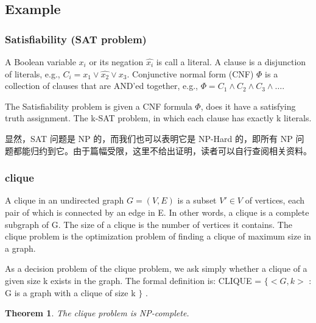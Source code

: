 \documentclass{article}
\newtheorem*{Theorem}{Theorem}
\begin{document}
\subsection{Example}

\subsubsection{Satisfiability (SAT problem)}
A Boolean variable $x_i$ or its negation $\hat{x_i}$ is call a literal. A clause is a disjunction of literals, e.g., $C_i = x_1 \lor \hat{x_2} \lor x_3$. Conjunctive normal form (CNF) $\Phi$ is a collection of clauses that are AND'ed together, e.g., $\Phi = C_1 \land C_2 \land C_3 \land \dots$.\par
The Satisfiability problem is given a CNF formula $\Phi$, does it have a satisfying truth assignment. The k-SAT problem, in which each clause has exactly k literals.

显然，SAT 问题是 NP 的，而我们也可以表明它是 NP-Hard 的，即所有 NP 问题都能归约到它。由于篇幅受限，这里不给出证明，读者可以自行查阅相关资料。

\subsubsection{clique}
A clique in an undirected graph $G = (V, E)$ is a subset $V' \in V$ of vertices, each pair of which is connected by an edge in E. In other words, a clique is a complete subgraph of G. The size of a clique is the number of vertices it contains. The clique problem is the optimization problem of finding a clique of maximum size in a graph.\par
As a decision problem of the clique problem, we ask simply whether a clique of a given size k exists in the graph. The formal definition is: CLIQUE = $\{ <G, k>$ : G is a graph with a clique of size k $\}$ .

\begin{Theorem}
    The clique problem is NP-complete.
\end{Theorem}
\end{document}
